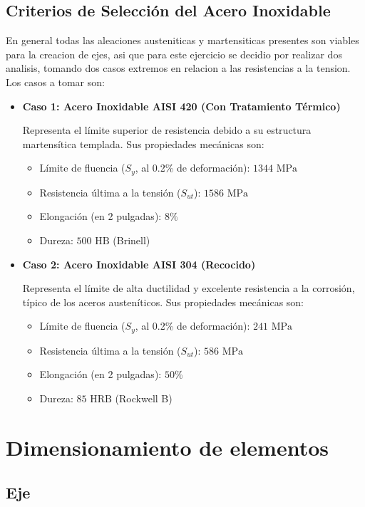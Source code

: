\documentclass[12pt, a4paper]{article}
\begin{document}
\subsection{Criterios de Selección del Acero Inoxidable}
En general todas las aleaciones austeniticas y martensiticas presentes son viables para la creacion de ejes, asi que para este ejercicio se decidio por realizar dos analisis, tomando dos casos extremos en relacion a las resistencias a la tension.
Los casos a tomar son: 
\begin{itemize}
    \item \textbf{Caso 1: Acero Inoxidable AISI 420 (Con Tratamiento Térmico)}
    
    Representa el límite superior de resistencia debido a su estructura martensítica templada. Sus propiedades mecánicas son:
    \begin{itemize}
        \item Límite de fluencia ($S_y$, al 0.2\% de deformación): $1344 \text{ MPa}$
        \item Resistencia última a la tensión ($S_{ut}$): $1586 \text{ MPa}$
        \item Elongación (en 2 pulgadas): $8\%$
        \item Dureza: $500 \text{ HB}$ (Brinell)
    \end{itemize}

    \item \textbf{Caso 2: Acero Inoxidable AISI 304 (Recocido)}
    
    Representa el límite de alta ductilidad y excelente resistencia a la corrosión, típico de los aceros austeníticos. Sus propiedades mecánicas son:
    \begin{itemize}
        \item Límite de fluencia ($S_y$, al 0.2\% de deformación): $241 \text{ MPa}$
        \item Resistencia última a la tensión ($S_{ut}$): $586 \text{ MPa}$
        \item Elongación (en 2 pulgadas): $50\%$
        \item Dureza: $85 \text{ HRB}$ (Rockwell B)
    \end{itemize}
\end{itemize}

\section{Dimensionamiento de elementos}
\subsection{Eje}
\end{document}
